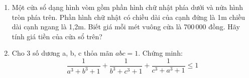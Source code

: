 \begin{ex}
	\begin{enumerate}
		\item[a)] Một cửa sổ dạng hình vòm gồm phần hình chữ nhật phía dưới và nửa hình tròn phía trên. Phần hình chữ nhật có chiều dài của cạnh đứng là 1m chiều dài cạnh ngang là 1,2m. Biết giá mỗi mét vuông cửa là 700\,000 đồng. Hãy tính giá tiền của cửa sổ trên?
		\item[b)] Cho 3 số dương a, b, c thỏa mãn $abc = 1$. Chứng minh:
		$$ \frac{1}{a^3+b^3+1} + \frac{1}{b^3+c^3+1} + \frac{1}{c^3+a^3+1} \le 1 $$
	\end{enumerate}
\end{ex}

